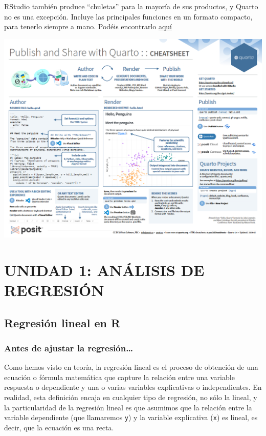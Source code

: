 \documentclass[
  letterpaper,
  DIV=11,
  numbers=noendperiod]{scrreprt}
\begin{document}
RStudio también produce ``chuletas'' para la mayoría de sus productos, y
Quarto no es una excepción. Incluye las principales funciones en un
formato compacto, para tenerlo siempre a mano. Podéis encontrarlo
\href{https://rstudio.github.io/cheatsheets/quarto.pdf}{aquí}

\includegraphics{images/02-intro-rmarkdown/cheatsheet_quarto.png}

\part{UNIDAD 1: ANÁLISIS DE REGRESIÓN}

\hypertarget{sec-RegLin}{%
\chapter{Regresión lineal en R}\label{sec-RegLin}}

\hypertarget{antes-de-ajustar-la-regresiuxf3n}{%
\section{Antes de ajustar la
regresión\ldots{}}\label{antes-de-ajustar-la-regresiuxf3n}}

Como hemos visto en teoría, la regresión lineal es el proceso de
obtención de una ecuación o fórmula matemática que capture la relación
entre una variable respuesta o dependiente y una o varias variables
explicativas o independientes. En realidad, esta definición encaja en
cualquier tipo de regresión, no sólo la lineal, y la particularidad de
la regresión lineal es que asumimos que la relación entre la variable
dependiente (que llamaremos \texttt{y}) y la variable explicativa
(\texttt{x}) es lineal, es decir, que la ecuación es una recta.
\end{document}
